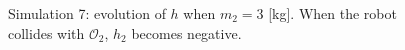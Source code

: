 \begin{figure}[p]
\begin{minipage}[b]{0.46\linewidth}
    \caption{\label{fig:sim7h3}Simulation 7: evolution of $h$ when $m_2=3$ [kg]. When the robot collides with $\mathcal{O}_2$, $h_2$ becomes negative.}
    \end{minipage}
    \vspace{128in}
\end{figure}





